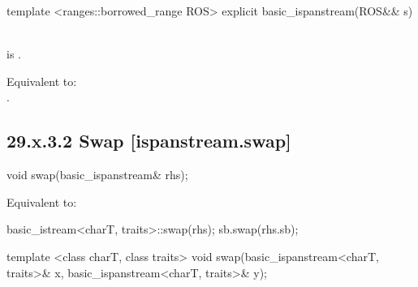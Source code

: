\documentclass[ebook,11pt,article]{memoir}
\begin{document}

\begin{itemdecl}
template <ranges::borrowed_range ROS>
explicit basic_ispanstream(ROS&& s)
\end{itemdecl}

\begin{itemdescr}
\pnum
\constraints
{}\\  is .

\pnum
\effects
Equivalent to:\\
.
\end{itemdescr}


\subsection{29.x.3.2 Swap [ispanstream.swap]}
\label{ispanstream.assign}

%

\begin{itemdecl}
void swap(basic_ispanstream& rhs);
\end{itemdecl}

\begin{itemdescr}
\pnum
\effects Equivalent to:
\begin{codeblock}
    basic_istream<charT, traits>::swap(rhs);
    sb.swap(rhs.sb);
\end{codeblock}
\end{itemdescr}


\begin{itemdecl}
template <class charT, class traits>
  void swap(basic_ispanstream<charT, traits>& x,
            basic_ispanstream<charT, traits>& y);
\end{itemdecl}
\end{document}
